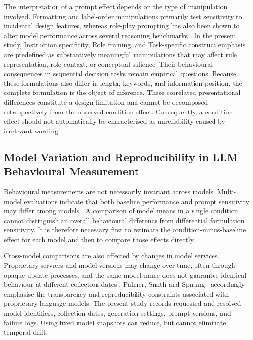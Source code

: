 The interpretation of a prompt effect depends on the type of manipulation involved. Formatting and label-order manipulations primarily test sensitivity to incidental design features, whereas role-play prompting has also been shown to alter model performance across several reasoning benchmarks \cite{Kong2024RolePlayPrompting}. In the present study, Instruction specificity, Role framing, and Task-specific construct emphasis are predefined as substantively meaningful manipulations that may affect rule representation, role context, or conceptual salience. Their behavioural consequences in sequential decision tasks remain empirical questions. Because these formulations also differ in length, keywords, and information position, the complete formulation is the object of inference. These correlated presentational differences constitute a design limitation and cannot be decomposed retrospectively from the observed condition effect. Consequently, a condition effect should not automatically be characterised as unreliability caused by irrelevant wording \cite{Sclar2024PromptFormatting,Hua2025FlawArtifact}.

\subsection{Model Variation and Reproducibility in LLM Behavioural Measurement}

Behavioural measurements are not necessarily invariant across models. Multi-model evaluations indicate that both baseline performance and prompt sensitivity may differ among models \cite{Sclar2024PromptFormatting,Mizrahi2024MultiPrompt,Zhuo2024ProSA}. A comparison of model means in a single condition cannot distinguish an overall behavioural difference from differential formulation sensitivity. It is therefore necessary first to estimate the condition-minus-baseline effect for each model and then to compare those effects directly.

Cross-model comparisons are also affected by changes in model services. Proprietary services and model versions may change over time, often through opaque update processes, and the same model name does not guarantee identical behaviour at different collection dates \cite{Chen2024ChatGPTBehavior}. Palmer, Smith and Spirling~\cite{Palmer2024ProprietaryModels} accordingly emphasise the transparency and reproducibility constraints associated with proprietary language models. The present study records requested and resolved model identifiers, collection dates, generation settings, prompt versions, and failure logs. Using fixed model snapshots can reduce, but cannot eliminate, temporal drift.

